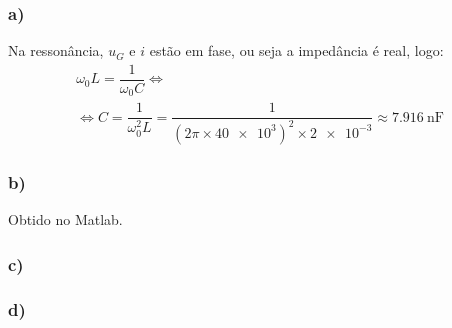 \documentclass[a4paper, titlepage, portuguese]{article}
\newcommand{\eq}{\Leftrightarrow} %
\begin{document}
	\subsubsection{a)}
		\par
		Na ressonância, $u_G$ e $i$ estão em fase, ou seja a impedância é real, logo:
		\begin{gather*}
			\omega_0 L = \dfrac{1}{\omega_0 C} \eq \\
			\eq C = \dfrac{1}{\omega_0^2 L} = \dfrac{1}{(2\pi \times \num{40e3})^2 \times \num{2e-3}} \approx \SI{7.916}{\nano\farad}
		\end{gather*}

	\subsubsection{b)}
		\par
		Obtido no Matlab.

	\subsubsection{c)}

	\subsubsection{d)}



\end{document}
